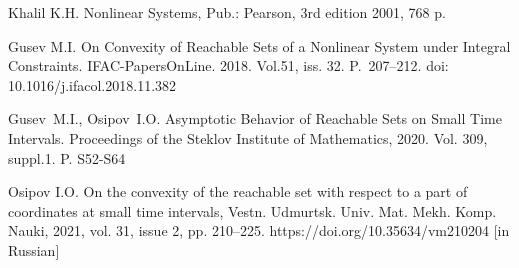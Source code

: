 \documentclass[12pt]{llncs}
\begin{document}
\begin{thebibliography}{9} %
Khalil K.H.  Nonlinear Systems, Pub.: Pearson, 3rd edition 2001, 768 p.

Gusev M.I. On Convexity of Reachable Sets of a Nonlinear System under Integral Constraints.
IFAC-PapersOnLine. 2018. Vol.51, iss. 32. P.~207--212. doi: 10.1016/j.ifacol.2018.11.382

Gusev~M.I., Osipov~I.O. Asymptotic Behavior of Reachable Sets on Small Time Intervals. Proceedings of the Steklov Institute of Mathematics, 2020. Vol. 309, suppl.1. P. S52-S64

Osipov I.O. On the convexity of the reachable set with respect to a part of coordinates at small time intervals,  Vestn. Udmurtsk. Univ. Mat. Mekh. Komp. Nauki, 2021, vol. 31, issue 2, pp. 210--225.  https://doi.org/10.35634/vm210204 [in Russian]


\end{thebibliography}

\end{document}
